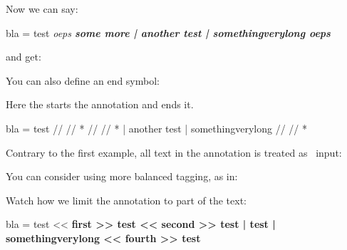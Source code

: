 \startbuffer[setup]
\setuptyping
  [annotatedtyping]
  [escape=\letterbackslash]
\stopbuffer

\typebuffer[setup][option=TEX] \getbuffer[setup]

Now we can say:

\startbuffer[example]
\startannotatedtyping
bla = test               \bgroup \sl oeps \egroup
                         \bgroup \bf some more \egroup
    | another test
    | somethingverylong  \bgroup \it oeps \egroup
\stopannotatedtyping
\stopbuffer

\typebuffer[example][option=TEX]

and get:

\starttextbackground[example]
    \getbuffer[example]
\stoptextbackground

You can also define an end symbol:

\startbuffer[setup]
\setuptyping
  [annotatedtyping]
  [escape={//,*},
   color=darkblue]

\stopbuffer

\typebuffer[setup][option=TEX] \getbuffer[setup]

Here the \type {//} starts the annotation and \type {*} ends it.

\startbuffer[example]
\startannotatedtyping
bla = test               // \black //  *
                         // \black //  *
    | another test
    | somethingverylong  // \black //  *
\stopannotatedtyping
\stopbuffer

\typebuffer[example][option=TEX]

Contrary to the first example, all text in the annotation is treated as \TEX\
input:

\starttextbackground[example]
    \getbuffer[example]
\stoptextbackground

You can consider using more balanced tagging, as in:

\startbuffer[setup]
\setuptyping
  [annotatedtyping]
  [escape={<<,>>},
   color=darkblue]
\stopbuffer

\typebuffer[example][option=TEX]

Watch how we limit the annotation to part of the text:

\startbuffer[example]
\startannotatedtyping
bla = test               << \rm\bf first  >> test
                         << \rm\bf second >> test
    | test
    | somethingverylong  << \rm\bf fourth >> test
\stopannotatedtyping
\stopbuffer

